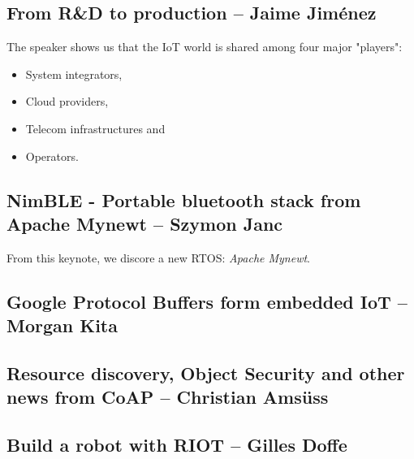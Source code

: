 \documentclass[journal, a4paper]{../IEEEtran}
\begin{document}
\subsection{From R\&D to production -- Jaime Jiménez}
The speaker shows us that the IoT world is shared among four major "players":
\begin{itemize}
    \item System integrators,
    \item Cloud providers,
    \item Telecom infrastructures and
    \item Operators.
\end{itemize}


\subsection{NimBLE - Portable bluetooth stack from Apache Mynewt -- Szymon Janc}
From this keynote, we discore a new RTOS: \textit{Apache Mynewt}.


\subsection{Google Protocol Buffers form embedded IoT -- Morgan Kita}


\subsection{Resource discovery, Object Security and other news from CoAP -- 
Christian Amsüss}


\subsection{Build a robot with RIOT -- Gilles Doffe}
 
\end{document}
